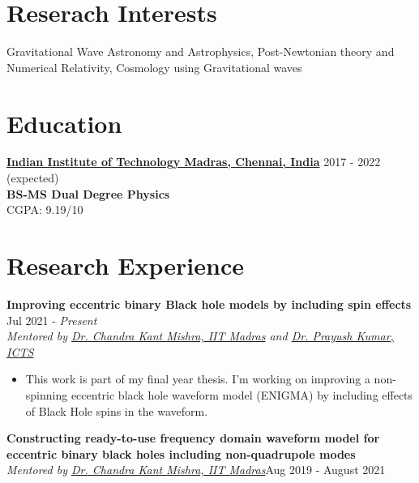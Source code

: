 \documentclass[margin, centered]{res}
\begin{document}
\begin{resume}

\section{Reserach Interests}
Gravitational Wave Astronomy and Astrophysics, Post-Newtonian theory and Numerical Relativity, Cosmology using Gravitational waves
\\
\section{Education}


\textbf{\href{https://www.iitm.ac.in/}{Indian Institute of Technology Madras, Chennai, India}} \hfill 2017 - 2022 (expected) \\
\textbf{BS-MS Dual Degree Physics} \\
CGPA: 9.19/10
\section{Research Experience}


\textbf{Improving eccentric binary Black hole models by including spin effects} \hfill Jul 2021 - \textit{Present}\\
\emph{Mentored by \href{https://physics.iitm.ac.in/ckm}{Dr. Chandra Kant Mishra, IIT Madras} and \href{https://www.icts.res.in/people/prayush-kumar}{Dr. Prayush Kumar, ICTS}}

\begin{itemize}
    \item This work is part of my final year thesis. I'm working on improving a non-spinning eccentric black hole waveform model (ENIGMA) by including effects of Black Hole spins in the waveform.
\end{itemize}

\textbf{Constructing ready-to-use frequency domain waveform model for eccentric binary black holes including non-quadrupole modes} \\
\emph{Mentored by \href{https://physics.iitm.ac.in/ckm}{Dr. Chandra Kant Mishra, IIT Madras}}\hfill Aug 2019 - August 2021


\end{resume}
\end{document}

